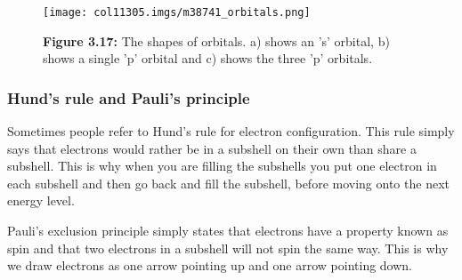	\begin{figure}[H] %
    \begin{center}
    \label{m38741*uid8934!!!underscore!!!media}\label{m38741*uid8934!!!underscore!!!printimage}\texttt{[image: col11305.imgs/m38741\_orbitals.png]} %
      \vspace{2pt}
    \vspace{\rubberspace}\par \begin{cnxcaption}
	  \small \textbf{Figure 3.17: }The shapes of orbitals. a) shows an 's' orbital, b) shows a single 'p' orbital and c) shows the three 'p' orbitals.
	\end{cnxcaption}
    \vspace{.1in}
    \end{center}
 \end{figure}       \par \label{m38741*eip-581}
            \subsubsection{ Hund's rule and Pauli's principle}
            \nopagebreak
            \label{m38741*eip-188}
Sometimes people refer to Hund's rule for electron configuration. This rule simply says that electrons would rather be in a subshell on their own than share a subshell. This is why when you are filling the subshells you put one electron in each subshell and then go back and fill the subshell, before moving onto the next energy level.
\par 
\label{m38741*eip-id1167385514309}
Pauli's exclusion principle simply states that electrons have a property known as spin and that two electrons in a subshell will not spin the same way. This is why we draw electrons as one arrow pointing up and one arrow pointing down.
\par \label{m38741*uid104}
